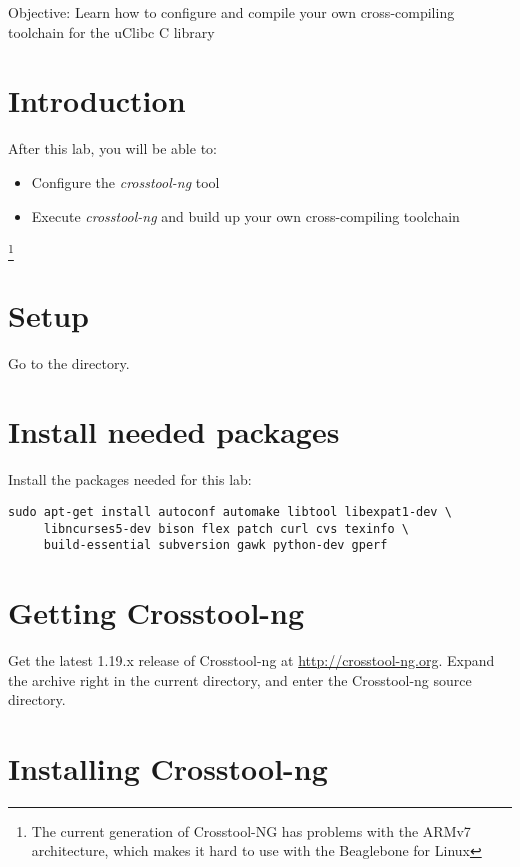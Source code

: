   {Objective: Learn how to configure and compile your own cross-compiling toolchain for the uClibc C
  library}

\section{Introduction}

After this lab, you will be able to:

\begin{itemize}
\item Configure the {\em crosstool-ng} tool
\item Execute {\em crosstool-ng} and build up your own cross-compiling toolchain
\end{itemize}

\footnote{The current generation of Crosstool-NG has problems with the ARMv7 architecture, 
which makes it hard to use with the Beaglebone for Linux}

\section{Setup}

Go to the  directory.

\section{Install needed packages}

Install the packages needed for this lab:

\begin{verbatim}
sudo apt-get install autoconf automake libtool libexpat1-dev \
     libncurses5-dev bison flex patch curl cvs texinfo \
     build-essential subversion gawk python-dev gperf
\end{verbatim}

\section{Getting Crosstool-ng}

Get the latest 1.19.x release of Crosstool-ng at
\url{http://crosstool-ng.org}. Expand the archive right in the current
directory, and enter the Crosstool-ng source directory.

\section{Installing Crosstool-ng}


